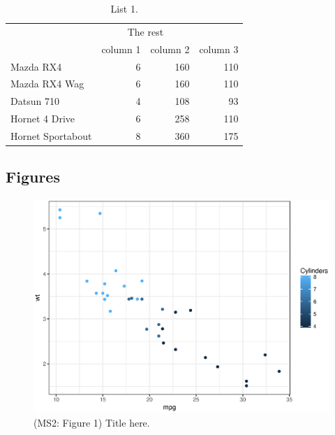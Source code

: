 \documentclass[12pt,report]{uncdissertation}
\newcommand{\blandscape}{\begin{landscape}}
\newcommand{\elandscape}{\end{landscape}}
\begin{document}
\singlespace

\begin{longtable}[t]{lrrr}
\caption{\label{tab:unnamed-chunk-11}List 1.}\\
\toprule
\multicolumn{1}{c}{ } & \multicolumn{2}{c}{The rest} \\
\cmidrule(l{2pt}r{2pt}){2-3}
  & column 1 & column 2 & column 3\\
\midrule
Mazda RX4 & 6 & 160 & 110\\
Mazda RX4 Wag & 6 & 160 & 110\\
Datsun 710 & 4 & 108 & 93\\
Hornet 4 Drive & 6 & 258 & 110\\
Hornet Sportabout & 8 & 360 & 175\\
\bottomrule
\end{longtable}

\clearpage
\newpage

\blandscape

\section{Figures}\label{figures-1}

\centering

\begin{figure}[H]
\centering
\caption{(MS2: Figure 1) Title here.}
\includegraphics{includes/figures/fig2.eps}
\end{figure}

\elandscape

\setlength{\parindent}{-0.2in} \setlength{\leftskip}{0.2in}
\setlength{\parskip}{8pt}
\end{document}
